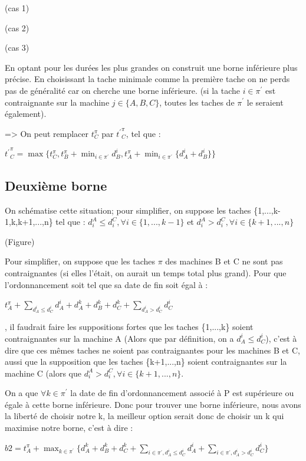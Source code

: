\documentclass[12pt]{article}
\begin{document}
(cas 1)

(cas 2)

(cas 3)

En optant pour les durées les plus grandes on construit une borne inférieure plus précise. En choisissant la tache minimale comme la première tache on ne perds pas de généralité car on cherche une borne inférieure. (si la tache $i\in\pi^\prime$ est contraignante sur la machine $j\in\{A,B,C\}$, toutes les taches de $\pi^\prime$ le seraient également).

=> On peut remplacer $t_C^\pi$ par ${t^\prime}_C^\pi$, tel que :\\
\begin{center}
${t^\prime}_C^\pi = \max\{t_C^\pi,t_B^\pi + \displaystyle\min_{i \in \pi^\prime} d_B^i, t_A^\pi + \displaystyle\min_{i \in \pi^\prime}\{d_A^i + d_B^i\}\}$
\end{center}

\subsection{Deuxième borne}

On schématise cette situation; pour simplifier, on suppose les taches \{1,...,k-1,k,k+1,...,n\} tel que : $d_i^A \le d_i^C, \forall i \in \{1,...,k-1\}$ et $d_i^A > d_i^C, \forall i \in \{k+1,...,n\}$

(Figure)

Pour simplifier, on suppose que les taches $\pi$ des machines B et C ne sont pas contraignantes (si elles l'était, on aurait un temps total plus grand). Pour que l'ordonnancement soit tel que sa date de fin soit égal à :\\
\begin{center}
$t_A^\pi + \displaystyle\sum_{d_A^i \le d_C^i}d_A^i + d_A^k + d_B^k + d_C^k + \displaystyle\sum_{d_A^i > d_C^i}d_C^i$\\
\end{center}
, il faudrait faire les suppositions fortes que les taches \{1,...,k\} soient contraignantes sur la machine A (Alors que par définition, on a $d_A^i \le d_C^i$), c'est à dire que ces mêmes taches ne soient pas contraignantes pour les machines B et C, aussi que la supposition que les taches \{k+1,...,n\} soient contraignantes sur la machine C (alors que $d_i^A > d_i^C, \forall i \in \{k+1,...,n\}$.

On a que $\forall k \in \pi^\prime$ la date de fin d'ordonnancement associé à P est supérieure ou égale à cette borne inférieure. Donc pour trouver une borne inférieure, nous avons la liberté de choisir notre k, la meilleur option serait donc de choisir un k qui maximise notre borne, c'est à dire :\\
\begin{center}
 $b2 = t_A^\pi + \displaystyle\max_{k \in \pi^\prime}\{d_A^k + d_B^k + d_C^k + \displaystyle\sum_{i \in \pi^\prime,d_A^i \le d_C^i} d_A^i + \displaystyle\sum_{i \in \pi^\prime,d_A^i > d_C^i} d_C^i\} $\\
\end{center}
\end{document}
